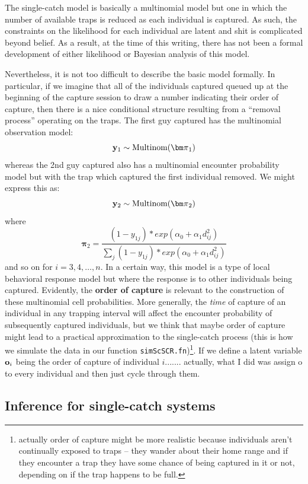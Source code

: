 The single-catch model is basically a multinomial model but one in
which the number of available traps is reduced as each individual is
captured. As such, the constraints on the likelihood for each
individual are latent and shit is complicated beyond belief.  As a
result, at the time of this writing, there has not been a formal
development of either likelihood or Bayesian analysis of this model.

Nevertheless, it is not too difficult to describe the basic model
formally. In particular, if we imagine that all of the individuals
captured queued up at the beginning of the capture session to draw a
number indicating their order of capture, then there is a nice conditional structure
resulting from a ``removal process'' operating on the traps.  The
first guy captured has the multinomial observation model:
\[
{\bf y}_{1} \sim \mbox{Multinom}({\bm \pi}_{1})
\]
whereas the 2nd guy captured also has a multinomial encounter
probability model but with the trap which captured the first
individual removed. We might express this as:
\[
{\bf y}_{2} \sim \mbox{Multinom}({\bm \pi}_{2})
\]
where
\[
 {\bm \pi}_{2}  = \frac{ (1-y_{1j}) *exp( \alpha_{0} + \alpha_{1}   d_{ij}^{2}) }
{ \sum_{j} (1-y_{1j}) *exp( \alpha_{0} + \alpha_{1}   d_{ij}^{2}) }
\]
and so on for $i=3,4,\ldots,n$.
 In a certain way, this model is a type of local behavioral
response model but where the response is to other individuals being
captured.  
Evidently, the {\bf order of capture} is relevant to the
construction of these multinomial cell probabilities. More generally,
the {\it time} of capture of an individual in any trapping interval
will affect the encounter probability of subsequently captured
individuals, but we think that maybe order of capture might lead to a
practical approximation to the single-catch process (this is how we
simulate the data in our function \mbox{\tt simScSCR.fn})\footnote{actually order of
  capture might be more realistic because individuals aren't
  continually exposed to traps -- they wander about their home range
  and if they encounter a trap they have some chance of being captured
  in it or not, depending on if the trap happens to be full. }.  If we
define a latent variable ${\bf o}_{i}$ being the order of capture of
individual $i$....... actually, what I did was assign o to every
individual and then just cycle through them.


\subsection{Inference for single-catch systems}


